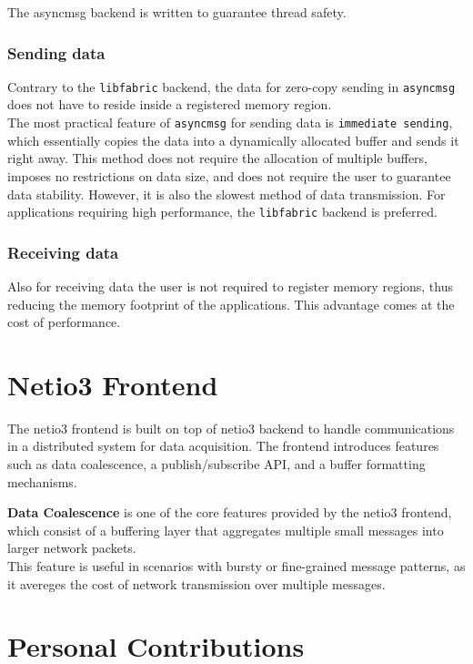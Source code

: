 The asyncmsg backend is written to guarantee thread safety.

\subsubsection{Sending data}

Contrary to the \texttt{libfabric} backend, the data for zero-copy sending in \texttt{asyncmsg} does not have to reside inside a registered memory region.\\
The most practical feature of \texttt{asyncmsg} for sending data is \texttt{immediate sending}, which essentially copies the data into a dynamically allocated buffer and sends it right away. This method does not require the allocation of multiple buffers, imposes no restrictions on data size, and does not require the user to guarantee data stability. However, it is also the slowest method of data transmission. For applications requiring high performance, the \texttt{libfabric} backend is preferred.

\subsubsection{Receiving data}

Also for receiving data the user is not required to register memory regions, thus reducing the memory footprint of the applications. This advantage comes at the cost of performance.\\

\section{Netio3 Frontend}

The netio3 frontend is built on top of netio3 backend to handle communications in a distributed system for data acquisition. The frontend introduces features such as data coalescence, a publish/subscribe \acs{API}, and a buffer formatting mechanisms.

\textbf{Data Coalescence} is one of the core features provided by the netio3 frontend, which consist of a buffering layer that aggregates multiple small messages into larger network packets.\\
This feature is useful in scenarios with bursty or fine-grained message patterns, as it avereges the cost of network transmission over multiple messages.

\clearpage
\section{Personal Contributions}

